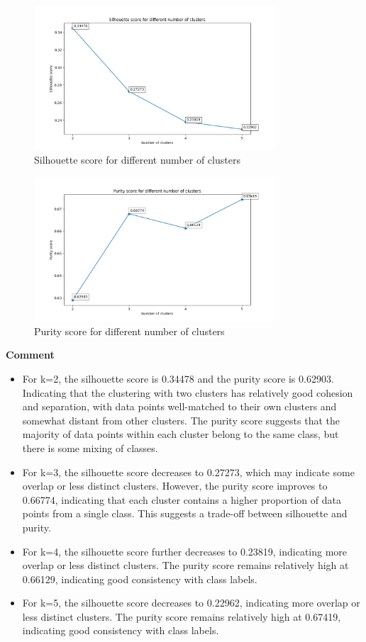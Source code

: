 \documentclass{article}
\begin{document}
\begin{figure}[H]
  \centering
  \includegraphics[width=0.8\textwidth]{images/silhouette.png}
  \caption{Silhouette score for different number of clusters}
  \label{fig:silhouette}
\end{figure}

\begin{figure}[H]
  \centering
  \includegraphics[width=0.8\textwidth]{images/purity.png}
  \caption{Purity score for different number of clusters}
  \label{fig:purity}
\end{figure}

\textbf{Comment}

\begin{itemize}
  \item For k=2, the silhouette score is 0.34478 and the purity score is 0.62903. Indicating that the clustering with two clusters has relatively good cohesion and separation, with data points well-matched to their own clusters and somewhat distant from other clusters. The purity score suggests that the majority of data points within each cluster belong to the same class, but there
  is some mixing of classes.
  \item For k=3, the silhouette score decreases to 0.27273, which may indicate some overlap or less distinct clusters. However, the purity score improves to 0.66774, indicating that each cluster contains a higher proportion of data points from a single class. This suggests a trade-off between silhouette and purity.
  \item For k=4, the silhouette score further decreases to 0.23819, indicating more overlap or less distinct clusters. The purity score remains relatively high at 0.66129, indicating good consistency with class labels.
  \item For k=5, the silhouette score decreases to 0.22962, indicating more overlap or less distinct clusters. The purity score remains relatively high at 0.67419, indicating good consistency with class labels.
\end{itemize}
\end{document}
